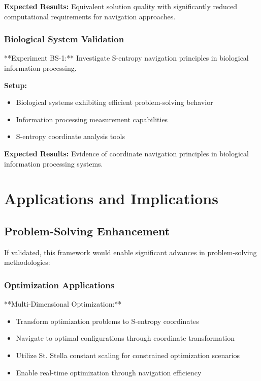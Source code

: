 \documentclass[11pt]{article}
\begin{document}
\textbf{Expected Results:} Equivalent solution quality with significantly reduced computational requirements for navigation approaches.

\subsubsection{Biological System Validation}

**Experiment BS-1:** Investigate S-entropy navigation principles in biological information processing.

\textbf{Setup:}
\begin{itemize}
\item Biological systems exhibiting efficient problem-solving behavior
\item Information processing measurement capabilities
\item S-entropy coordinate analysis tools
\end{itemize}

\textbf{Expected Results:} Evidence of coordinate navigation principles in biological information processing systems.

\section{Applications and Implications}

\subsection{Problem-Solving Enhancement}

If validated, this framework would enable significant advances in problem-solving methodologies:

\subsubsection{Optimization Applications}

**Multi-Dimensional Optimization:**
\begin{itemize}
\item Transform optimization problems to S-entropy coordinates
\item Navigate to optimal configurations through coordinate transformation
\item Utilize St. Stella constant scaling for constrained optimization scenarios
\item Enable real-time optimization through navigation efficiency
\end{itemize}
\end{document}
